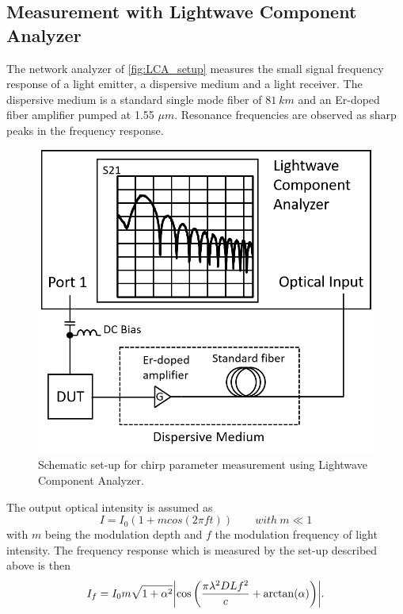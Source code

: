
\subsection{Measurement with Lightwave Component Analyzer}\label{subsec:measurement_with_LCA}
The network analyzer of \autoref{fig:LCA_setup} measures the small signal frequency response of a light emitter, a dispersive medium and a light receiver. The dispersive medium is a standard single mode fiber of $81 \ km$ and an Er-doped fiber amplifier pumped at 1.55 $\mu m$. Resonance frequencies are observed as sharp peaks in the frequency response.
\begin{figure}[ht]
    \centering
    \includegraphics[width=.5\linewidth]{figures/LCA_setup.png}
    \caption{Schematic set-up for chirp parameter measurement using Lightwave Component Analyzer.}
    \label{fig:LCA_setup}
\end{figure}

The output optical intensity is assumed as \cite{devaux1993simple}
\begin{equation}
    I=I_0(1+mcos(2\pi ft)) \qquad with \ m \ll 1
    \label{eq:chirp_optical_intensity}
\end{equation}
with $m$ being the modulation depth and $f$ the modulation frequency of light intensity. The frequency response which is measured by the set-up described above is then \cite{devaux1993simple}
\begin{equation}
    I_f=I_0m\sqrt{1+\alpha^2}\abs{\cos\qty(\frac{\pi\lambda^2DLf^2}{c}+\arctan(\alpha))}.
    \label{eq:chirp_optical_frequency}
\end{equation}

